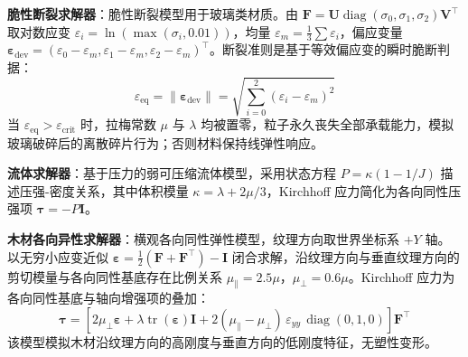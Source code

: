 \textbf{脆性断裂求解器}：脆性断裂模型用于玻璃类材质。由 $\mathbf{F}=\mathbf{U}\operatorname{diag}(\sigma_0,\sigma_1,\sigma_2)\mathbf{V}^{\top}$ 取对数应变 $\varepsilon_i=\ln(\max(\sigma_i,0.01))$，均量 $\varepsilon_m=\frac{1}{3}\sum\varepsilon_i$，偏应变量 $\boldsymbol{\varepsilon}_{\text{dev}}=(\varepsilon_0-\varepsilon_m,\varepsilon_1-\varepsilon_m,\varepsilon_2-\varepsilon_m)^{\top}$。断裂准则是基于等效偏应变的瞬时脆断判据：
\begin{equation}
\varepsilon_{\text{eq}}=\|\boldsymbol{\varepsilon}_{\text{dev}}\|=\sqrt{\sum_{i=0}^{2}(\varepsilon_i-\varepsilon_m)^2}
\end{equation}
当 $\varepsilon_{\text{eq}}>\varepsilon_{\text{crit}}$ 时，拉梅常数 $\mu$ 与 $\lambda$ 均被置零，粒子永久丧失全部承载能力，模拟玻璃破碎后的离散碎片行为；否则材料保持线弹性响应。

\textbf{流体求解器}：基于压力的弱可压缩流体模型，采用状态方程 $P=\kappa(1-1/J)$ 描述压强-密度关系，其中体积模量 $\kappa=\lambda+2\mu/3$，Kirchhoff 应力简化为各向同性压强项 $\boldsymbol{\tau}=-P\mathbf{I}$。

\textbf{木材各向异性求解器}：横观各向同性弹性模型，纹理方向取世界坐标系 $+Y$ 轴。以无穷小应变近似 $\boldsymbol{\varepsilon}=\frac{1}{2}(\mathbf{F}+\mathbf{F}^{\top})-\mathbf{I}$ 闭合求解，沿纹理方向与垂直纹理方向的剪切模量与各向同性基底存在比例关系 $\mu_{\parallel}=2.5\mu$，$\mu_{\perp}=0.6\mu$。Kirchhoff 应力为各向同性基底与轴向增强项的叠加：
\begin{equation}
\boldsymbol{\tau}=\left[2\mu_{\perp}\boldsymbol{\varepsilon}+\lambda\operatorname{tr}(\boldsymbol{\varepsilon})\mathbf{I}+2(\mu_{\parallel}-\mu_{\perp})\,\varepsilon_{yy}\,\operatorname{diag}(0,1,0)\right]\mathbf{F}^{\top}
\end{equation}
该模型模拟木材沿纹理方向的高刚度与垂直方向的低刚度特征，无塑性变形。

